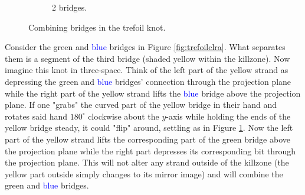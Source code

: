 \documentclass[titlepage]{article}
\begin{document}
\begin{figure}[h!]
\begin{subfigure}[b]{0.3\linewidth}
        \caption{2 bridges.}
        \label{fig:trefoilclrb}
    \end{subfigure}
    \caption{Combining bridges in the trefoil knot.}
    \label{fig:trefoilclr}
\end{figure}

Consider the \textcolor{grx}{green} and \textcolor{blue}{blue} bridges in Figure \ref{fig:trefoilclra}. What separates them is a segment of the third bridge (shaded \textcolor{ylx}{yellow} within the killzone). Now imagine this knot in three-space. Think of the left part of the \textcolor{ylx}{yellow} strand as depressing the \textcolor{grx}{green} and \textcolor{blue}{blue} bridges' connection through the projection plane while the right part of the \textcolor{ylx}{yellow} strand lifts the \textcolor{blue}{blue} bridge above the projection plane. If one "grabs" the curved part of the \textcolor{ylx}{yellow} bridge in their hand and rotates said hand $180^\circ$ clockwise about the $y$-axis while holding the ends of the \textcolor{ylx}{yellow} bridge steady, it could "flip" around, settling as in Figure \ref{fig:trefoilclrb}. Now the left part of the \textcolor{ylx}{yellow} strand lifts the corresponding part of the \textcolor{grx}{green} bridge above the projection plane while the right part depresses its corresponding bit through the projection plane. This will not alter any strand outside of the killzone (the \textcolor{ylx}{yellow} part outside simply changes to its mirror image) and will combine the \textcolor{grx}{green} and \textcolor{blue}{blue} bridges.\par
\end{document}
